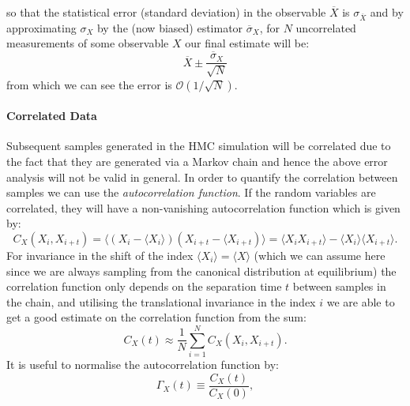 \documentclass[12pt]{article}
\begin{document}
            so that the statistical error (standard deviation) in the observable $\overline{X}$ is $\sigma_{\overline{X}}$ and by approximating $\sigma_X$ by the (now biased) estimator $\overline{\sigma}_X$, for $N$ uncorrelated measurements of some observable $X$ our final estimate will be:
            \begin{equation}
                \label{eq:niaveerror}
                \overline{X}\pm \frac{\overline{\sigma}_X}{\sqrt{N}}
            \end{equation}
            from which we can see the error is $\mathcal{O}\left(1/\sqrt{N}\right)$.



            \paragraph{Correlated Data} Subsequent samples generated in the HMC simulation will be correlated due to the fact that they are generated via a Markov chain and hence the above error analysis will not be valid in general. In order to quantify the correlation between samples we can use the \textit{autocorrelation function}. If the random variables are correlated, they will have a non-vanishing autocorrelation function which is given by:
            \begin{equation}
                \label{eq:autocorrelationfunction}
                C_{X}\left(X_i,X_{i+t}\right) = \langle \left(X_i-\langle X_i\rangle\right)\left(X_{i+t}-\langle X_{i+t}\right)\rangle = \langle X_iX_{i+t}\rangle - \langle X_i \rangle \langle X_{i+t} \rangle.
            \end{equation}
            For invariance in the shift of the index $\langle X_i \rangle = \langle X \rangle$ (which we can assume here since we are always sampling from the canonical distribution at equilibrium) the correlation function only depends on the separation time $t$ between samples in the chain, and utilising the translational invariance in the index $i$ we are able to get a good estimate on the correlation function from the sum:
            \begin{equation}
                C_{X}\left(t\right) \approx \frac{1}{N}\sum_{i=1}^NC_X\left(X_i,X_{i+t}\right).
            \end{equation}
            It is useful to normalise the autocorrelation function by:
            \begin{equation}
                \label{eq:normalisedAutocorrelation}
                \Gamma_{X}\left(t\right) \equiv \frac{C_X\left(t\right)}{C_X\left(0\right)},
            \end{equation}
\end{document}
